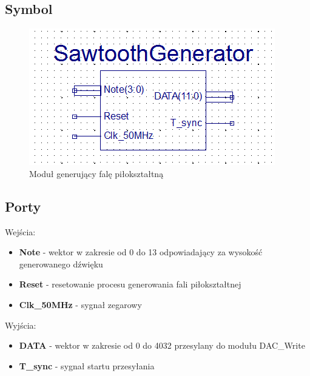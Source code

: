 \documentclass[a4paper]{report}
\begin{document}
		\subsection{Symbol}
			\begin{figure}[h!]
				\centering
				\includegraphics{sawtoothgenerator2.png}
				\caption{Moduł generujący falę piłokształtną}
			\end{figure}
		\subsection{Porty}
		{\Large Wejścia:}
			\begin{itemize}	 
				\item \textbf{Note} - wektor w zakresie od 0 do 13 odpowiadający za wysokość generowanego dźwięku
				\item \textbf{Reset} - resetowanie procesu generowania fali piłokształtnej
				\item \textbf{Clk\_50MHz} - sygnał zegarowy
			\end{itemize}
		{\Large Wyjścia:}
			\begin{itemize} 
				\item \textbf{DATA} - wektor w zakresie od 0 do 4032 przesylany do modułu DAC\_Write
				\item \textbf{T\_sync} - sygnał startu przesyłania
			\end{itemize}
\end{document}

